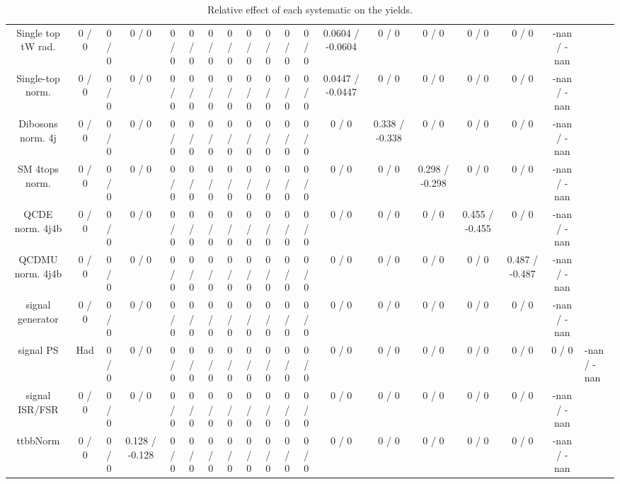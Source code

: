 \documentclass[10pt]{article}
\begin{document}
\begin{table}[htbp]
\begin{center}
\begin{tabular}{|c|c|c|c|c|c|c|c|c|c|c|c|c|c|c|c|c|c|}
  Single top tW rad. & 0 / 0 & 0 / 0 & 0 / 0 & 0 / 0 & 0 / 0 & 0 / 0 & 0 / 0 & 0 / 0 & 0 / 0 & 0 / 0 & 0 / 0 & 0.0604 / -0.0604 & 0 / 0 & 0 / 0 & 0 / 0 & 0 / 0 & -nan / -nan \\ 
  Single-top norm. & 0 / 0 & 0 / 0 & 0 / 0 & 0 / 0 & 0 / 0 & 0 / 0 & 0 / 0 & 0 / 0 & 0 / 0 & 0 / 0 & 0 / 0 & 0.0447 / -0.0447 & 0 / 0 & 0 / 0 & 0 / 0 & 0 / 0 & -nan / -nan \\ 
  Dibosons norm. 4j & 0 / 0 & 0 / 0 & 0 / 0 & 0 / 0 & 0 / 0 & 0 / 0 & 0 / 0 & 0 / 0 & 0 / 0 & 0 / 0 & 0 / 0 & 0 / 0 & 0.338 / -0.338 & 0 / 0 & 0 / 0 & 0 / 0 & -nan / -nan \\ 
  SM 4tops norm. & 0 / 0 & 0 / 0 & 0 / 0 & 0 / 0 & 0 / 0 & 0 / 0 & 0 / 0 & 0 / 0 & 0 / 0 & 0 / 0 & 0 / 0 & 0 / 0 & 0 / 0 & 0.298 / -0.298 & 0 / 0 & 0 / 0 & -nan / -nan \\ 
  QCDE norm. 4j4b & 0 / 0 & 0 / 0 & 0 / 0 & 0 / 0 & 0 / 0 & 0 / 0 & 0 / 0 & 0 / 0 & 0 / 0 & 0 / 0 & 0 / 0 & 0 / 0 & 0 / 0 & 0 / 0 & 0.455 / -0.455 & 0 / 0 & -nan / -nan \\ 
  QCDMU norm. 4j4b & 0 / 0 & 0 / 0 & 0 / 0 & 0 / 0 & 0 / 0 & 0 / 0 & 0 / 0 & 0 / 0 & 0 / 0 & 0 / 0 & 0 / 0 & 0 / 0 & 0 / 0 & 0 / 0 & 0 / 0 & 0.487 / -0.487 & -nan / -nan \\ 
  signal generator & 0 / 0 & 0 / 0 & 0 / 0 & 0 / 0 & 0 / 0 & 0 / 0 & 0 / 0 & 0 / 0 & 0 / 0 & 0 / 0 & 0 / 0 & 0 / 0 & 0 / 0 & 0 / 0 & 0 / 0 & 0 / 0 & -nan / -nan \\ 
  signal PS & Had & 0 / 0 & 0 / 0 & 0 / 0 & 0 / 0 & 0 / 0 & 0 / 0 & 0 / 0 & 0 / 0 & 0 / 0 & 0 / 0 & 0 / 0 & 0 / 0 & 0 / 0 & 0 / 0 & 0 / 0 & 0 / 0 & -nan / -nan \\ 
  signal ISR/FSR & 0 / 0 & 0 / 0 & 0 / 0 & 0 / 0 & 0 / 0 & 0 / 0 & 0 / 0 & 0 / 0 & 0 / 0 & 0 / 0 & 0 / 0 & 0 / 0 & 0 / 0 & 0 / 0 & 0 / 0 & 0 / 0 & -nan / -nan \\ 
 ttbbNorm & 0 / 0 & 0 / 0 & 0.128 / -0.128 & 0 / 0 & 0 / 0 & 0 / 0 & 0 / 0 & 0 / 0 & 0 / 0 & 0 / 0 & 0 / 0 & 0 / 0 & 0 / 0 & 0 / 0 & 0 / 0 & 0 / 0 & -nan / -nan \\ 
\hline 
\end{tabular} 
\caption{Relative effect of each systematic on the yields.} 
\end{center} 
\end{table} 
\end{document}

